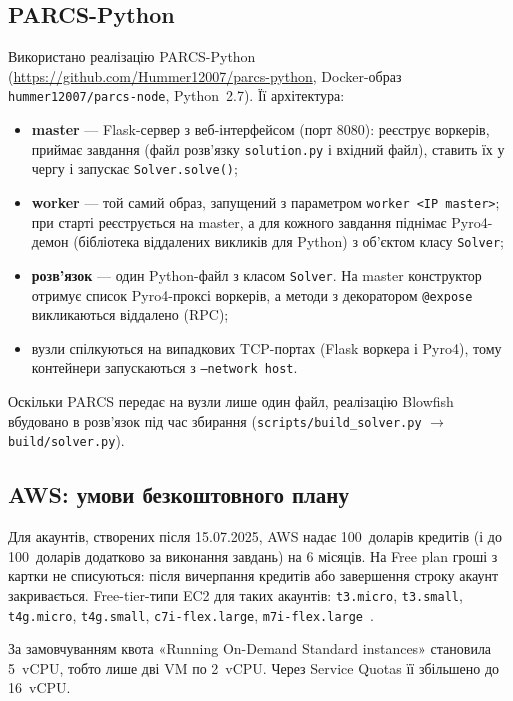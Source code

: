 \documentclass[a4paper,12pt]{article}
\begin{document}
\subsection{PARCS-Python}
Використано реалізацію PARCS-Python~\cite{hummer-parcs}
(\url{https://github.com/Hummer12007/parcs-python}, Docker-образ
\texttt{hummer12007/parcs-node}, Python~2.7). Її архітектура:
\begin{itemize}
  \item \textbf{master} --- Flask-сервер з веб-інтерфейсом (порт 8080): реєструє воркерів,
        приймає завдання (файл розв'язку \texttt{solution.py} і вхідний файл), ставить їх у
        чергу і запускає \texttt{Solver.solve()};
  \item \textbf{worker} --- той самий образ, запущений з параметром \texttt{worker <IP master>};
        при старті реєструється на master, а для кожного завдання піднімає
        Pyro4-демон (бібліотека віддалених викликів для Python) з об'єктом класу \texttt{Solver};
  \item \textbf{розв'язок} --- один Python-файл з класом \texttt{Solver}. На master
        конструктор отримує список Pyro4-проксі воркерів, а методи з декоратором
        \texttt{@expose} викликаються віддалено (RPC);
  \item вузли спілкуються на випадкових TCP-портах (Flask воркера і Pyro4),
        тому контейнери запускаються з \texttt{--network host}.
\end{itemize}
Оскільки PARCS передає на вузли лише один файл, реалізацію Blowfish вбудовано в
розв'язок під час збирання (\texttt{scripts/build\_solver.py} $\to$ \texttt{build/solver.py}).

\subsection{AWS: умови безкоштовного плану}
Для акаунтів, створених після 15.07.2025, AWS надає 100~доларів кредитів (і до
100~доларів додатково за виконання завдань) на 6 місяців. На Free plan гроші з
картки не списуються: після вичерпання кредитів або завершення строку акаунт
закривається. Free-tier-типи EC2 для таких акаунтів:
\texttt{t3.micro}, \texttt{t3.small}, \texttt{t4g.micro}, \texttt{t4g.small},
\texttt{c7i-flex.large}, \texttt{m7i-flex.large}~\cite{aws-free-plan}.

За замовчуванням квота «Running On-Demand Standard instances» становила 5~vCPU, тобто
лише дві VM по 2~vCPU. Через Service Quotas її збільшено до 16~vCPU.

\end{document}
